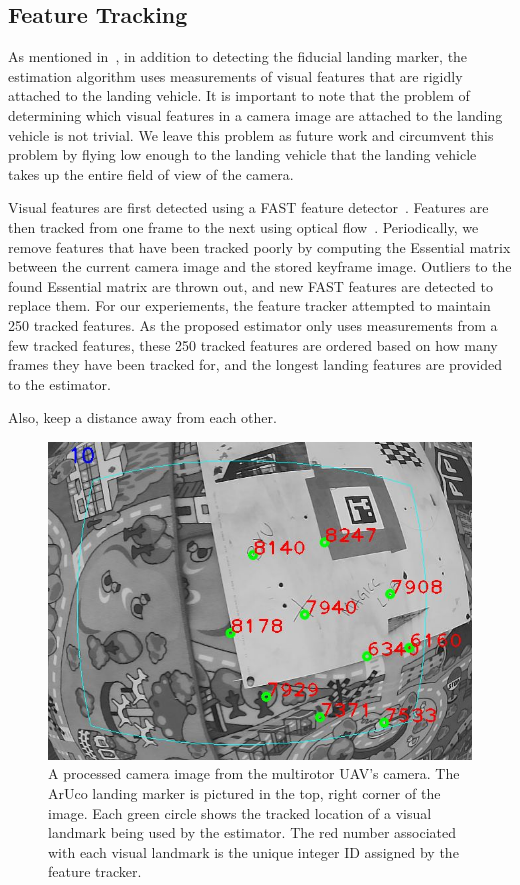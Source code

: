 
\subsection{Feature Tracking}
As mentioned in~, in addition to detecting the fiducial landing
marker, the estimation algorithm uses measurements of visual features that are
rigidly attached to the landing vehicle. It is important to note that the
problem of determining which visual features in a camera image are attached to
the landing vehicle is not trivial. We leave this problem as future work and
circumvent this problem by flying low enough to the landing vehicle that the
landing vehicle takes up the entire field of view of the camera.

Visual features are first detected using a FAST feature
detector~\cite{rosten2006machine}. Features are then tracked from one frame to
the next using optical flow~\cite{bouguet2001pyramidal}. Periodically, we remove
features that have been tracked poorly by computing the Essential matrix between
the current camera image and the stored keyframe image. Outliers to the found
Essential matrix are thrown out, and new FAST features are detected to replace
them. For our experiements, the feature tracker attempted to maintain 250
tracked features. As the proposed estimator only uses measurements from a few
tracked features, these 250 tracked features are ordered based on how many
frames they have been tracked for, and the longest landing features are provided
to the estimator.

Also, keep a distance away from each other.

\begin{figure}
  \centering
  \includegraphics[scale=0.5]{imgs/features_with_aruco.png}
  \caption{A processed camera image from the multirotor UAV's camera. The ArUco
  landing marker is pictured in the top, right corner of the image. Each green
circle shows the tracked location of a visual landmark being used by the
estimator. The red number associated with each visual landmark is the unique
integer ID assigned by the feature tracker.}
  \label{fig:features_with_aruco}
\end{figure}
